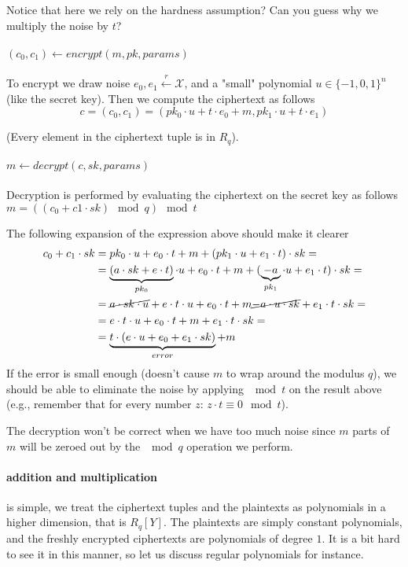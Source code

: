 Notice that here we rely on the hardness assumption? 
Can you guess why we multiply the noise by $t$?

\paragraph{$(c_0,c_1) \leftarrow encrypt(m,pk, params)$}
To encrypt we draw noise $e_0,e_1 \overset{r}{\leftarrow} \mathcal{X}$, and a "small" polynomial 
$u\in \{-1,0,1\}^n$ (like the secret key).
Then we compute the ciphertext as follows $$c=(c_0,c_1)= (pk_0\cdot u +t\cdot e_0+m, pk_1\cdot u +t\cdot e_1)$$

(Every element in the ciphertext tuple is in $R_q$).


\paragraph{$m \leftarrow decrypt(c,sk,params)$}

Decryption is performed by evaluating the ciphertext on the secret
key as follows $ m=((c_0+c1\cdot sk) \mod q) \mod t$

The following expansion of the expression above should make it clearer
\begin{align*}
c_{0}+c_{1}\cdot sk & =pk_{0}\cdot u+e_{0}\cdot t+m+(pk_{1}\cdot u+e_{1}\cdot t)\cdot sk=\\
 & =\underbrace{(a\cdot sk +e\cdot t)}_{pk_0} \cdot u + e_{0}\cdot t + m + (\underbrace{-a}_{pk_1}\cdot u+e_{1}\cdot t)\cdot sk=\\
 & = \cancel{a\cdot sk\cdot u} +e\cdot t\cdot u +e_{0}\cdot t + m  \cancel{-a\cdot u\cdot sk} +e_{1}\cdot t\cdot sk = \\
 & = e\cdot t\cdot u +e_{0}\cdot t + m  +e_{1}\cdot t\cdot sk = \\
 & = \underbrace{t\cdot (e\cdot u + e_0 +e_1\cdot sk)}_{error} + m
\end{align*}
If the error is small enough (doesn't cause $m$ to wrap around the modulus $q$), we should be able to eliminate the noise 
by applying $\mod t$ on the result above (e.g., remember that for every number $z$: $z\cdot t \equiv 0 \mod t$).

The decryption won't be correct when we have too much noise since $m$ parts of $m$
will be zeroed out by the $\mod q$ operation we perform.

\paragraph{addition and multiplication}
is simple, we treat the ciphertext tuples and the plaintexts as polynomials in a higher dimension,
that is $R_q[Y]$. The plaintexts are simply constant polynomials, and the freshly encrypted ciphertexts are polynomials 
of degree $1$.
It is a bit hard to see it in this manner, so let us discuss regular polynomials for instance.

